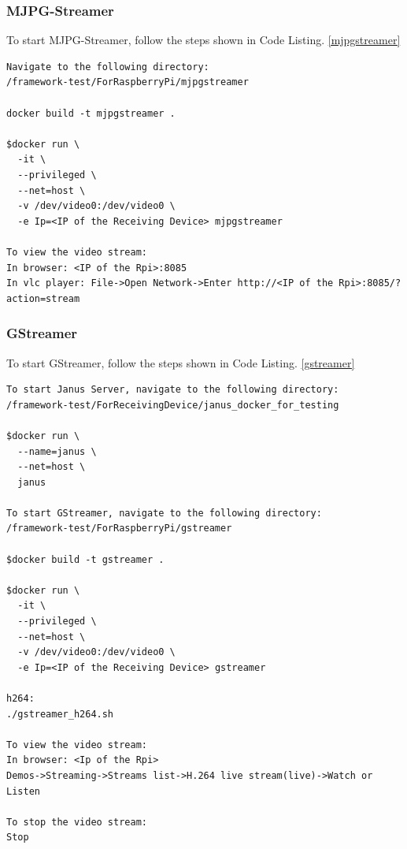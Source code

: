 \subsubsection*{MJPG-Streamer}
To start MJPG-Streamer, follow the steps shown in Code Listing. \ref{mjpgstreamer}

\begin{lstlisting}[caption={Build and run MJPG-Streamer}, frame=lines, label={mjpgstreamer}]
Navigate to the following directory:
/framework-test/ForRaspberryPi/mjpgstreamer

docker build -t mjpgstreamer .

$docker run \
  -it \
  --privileged \
  --net=host \
  -v /dev/video0:/dev/video0 \
  -e Ip=<IP of the Receiving Device> mjpgstreamer

To view the video stream:
In browser: <IP of the Rpi>:8085
In vlc player: File->Open Network->Enter http://<IP of the Rpi>:8085/?action=stream
\end{lstlisting}

\subsubsection*{GStreamer}
To start GStreamer, follow the steps shown in Code Listing. \ref{gstreamer}

\begin{lstlisting}[caption={Build and run GStreamer}, frame=lines, label={gstreamer}]
To start Janus Server, navigate to the following directory:
/framework-test/ForReceivingDevice/janus_docker_for_testing

$docker run \
  --name=janus \
  --net=host \
  janus 
  
To start GStreamer, navigate to the following directory:
/framework-test/ForRaspberryPi/gstreamer

$docker build -t gstreamer .

$docker run \
  -it \
  --privileged \
  --net=host \
  -v /dev/video0:/dev/video0 \
  -e Ip=<IP of the Receiving Device> gstreamer

h264:
./gstreamer_h264.sh 

To view the video stream:
In browser: <Ip of the Rpi>
Demos->Streaming->Streams list->H.264 live stream(live)->Watch or Listen

To stop the video stream:
Stop
\end{lstlisting}

